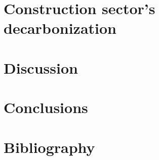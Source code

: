 \documentclass[10pt,twoside]{book}
\begin{document}
% 
\clearpage

\chapter{Construction sector's decarbonization}
\clearpage

% 
\clearpage

\chapter{Discussion}
\clearpage
% 
\clearpage

\chapter{Conclusions}
\clearpage
% 

\chapter{Bibliography}
\clearpage
\begin{multicols}{2}
\printbibliography[heading=none]
\end{multicols}
\end{document}
